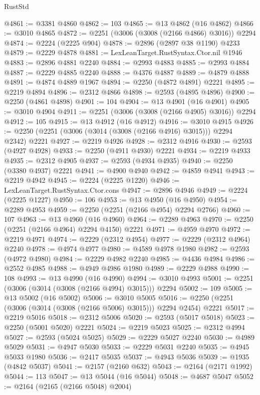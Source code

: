 \begin{lexlean}{RustStd}
\begin{coremodule}
@4861 := @3381 @4860
@4862 := 103
@4865 := @13 @4862 (@16 @4862)
@4866 := @3010 @4865
@4872 := @2251 (@3006 (@3008 (@2166 @4866) @3016)) @2294
@4874 := @2224 (@2225 @904)
@4878 := @2896 (@2897 @38 @1190) @4233
@4879 := @2229 @4878
@4881 := LexLeanTarget.RustSyntax.Ctor.nil @1946
@4883 := @2896 @4881 @2240
@4884 := @2993 @4883
@4885 := @2993 @4884
@4887 := @2229 @4885 @2240
@4888 := @4376 @4887
@4889 := @4879 @4888
@4891 := @4874 @4889 @1967
@4894 := @2250 (@4872 @4891) @2221
@4895 := @2219 @4894
@4896 := @2312 @4866
@4898 := @2593 (@4895 @4896)
@4900 := @2250 (@4861 @4898)
@4901 := 104
@4904 := @13 @4901 (@16 @4901)
@4905 := @3010 @4904
@4911 := @2251 (@3006 (@3008 (@2166 @4905) @3016)) @2294
@4912 := 105
@4915 := @13 @4912 (@16 @4912)
@4916 := @3010 @4915
@4926 := @2250 (@2251 (@3006 (@3014 (@3008 (@2166 @4916) @3015))) @2294 @2342) @2221
@4927 := @2219 @4926
@4928 := @2312 @4916
@4930 := @2593 (@4927 @4928)
@4933 := @2250 (@4911 @4930) @2221
@4934 := @2219 @4933
@4935 := @2312 @4905
@4937 := @2593 (@4934 @4935)
@4940 := @2250 (@3380 @4937) @2221
@4941 := @4900 @4940
@4942 := @4859 @4941
@4943 := @2219 @4942
@4945 := @2224 (@2225 @1220)
@4946 := LexLeanTarget.RustSyntax.Ctor.cons
@4947 := @2896 @4946
@4949 := @2224 (@2225 @1227)
@4950 := 106
@4953 := @13 @4950 (@16 @4950)
@4954 := @2289 @4953
@4959 := @2250 (@2251 (@2166 @4954) @2294 @2766)
@4960 := 107
@4963 := @13 @4960 (@16 @4960)
@4964 := @2289 @4963
@4970 := @2250 (@2251 (@2166 @4964) @2294 @4150) @2221
@4971 := @4959 @4970
@4972 := @2219 @4971
@4974 := @2229 (@2312 @4954)
@4977 := @2229 (@2312 @4964) @2240
@4978 := @4974 @4977
@4980 := @4589 @4978 @1980
@4982 := @2593 (@4972 @4980)
@4984 := @2229 @4982 @2240
@4985 := @4436 @4984
@4986 := @2552 @4985
@4988 := @4949 @4986 @1980
@4989 := @2229 @4988
@4990 := 108
@4993 := @13 @4990 (@16 @4990)
@4994 := @3010 @4993
@5001 := @2251 (@3006 (@3014 (@3008 (@2166 @4994) @3015))) @2294
@5002 := 109
@5005 := @13 @5002 (@16 @5002)
@5006 := @3010 @5005
@5016 := @2250 (@2251 (@3006 (@3014 (@3008 (@2166 @5006) @3015))) @2294 @2454) @2221
@5017 := @2219 @5016
@5018 := @2312 @5006
@5020 := @2593 (@5017 @5018)
@5023 := @2250 (@5001 @5020) @2221
@5024 := @2219 @5023
@5025 := @2312 @4994
@5027 := @2593 (@5024 @5025)
@5029 := @2229 @5027 @2240
@5030 := @4989 @5029
@5031 := @4947 @5030
@5033 := @2229 @5031 @2240
@5035 := @4945 @5033 @1980
@5036 := @2417 @5035
@5037 := @4943 @5036
@5039 := @1935 (@4842 @5037)
@5041 := @2157 (@2160 @632)
@5043 := @2164 (@2171 @1992)
@5044 := 113
@5047 := @13 @5044 (@16 @5044)
@5048 := @4687 @5047
@5052 := @2164 (@2165 (@2166 @5048) @2004)

\end{coremodule}
\end{lexlean}
